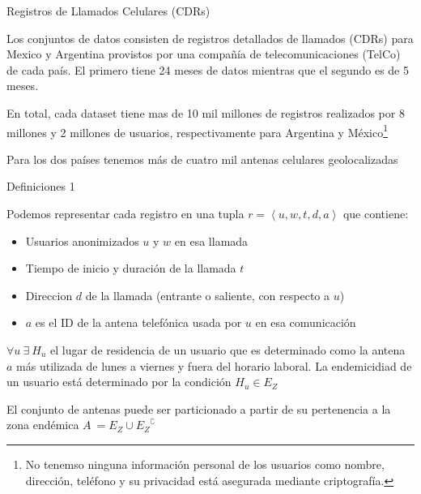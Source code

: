 \documentclass[xcolor=x11names]{beamer}
\begin{document}
\begin{frame}{Registros de Llamados Celulares (CDRs)}

Los conjuntos de datos consisten de registros detallados de llamados (CDRs) para Mexico y Argentina provistos por una compañía de telecomunicaciones (TelCo) de cada país. El primero tiene 24 meses de datos mientras que el segundo es de 5 meses.

\medskip

En total, cada dataset tiene mas de 10 mil millones de registros realizados por 8 millones y 2 millones de usuarios, respectivamente para Argentina y México\footnote{No tenemso ninguna información personal de los usuarios como nombre, dirección, teléfono y su privacidad está asegurada mediante criptografía.}

\medskip
Para los dos países tenemos más de cuatro mil antenas celulares geolocalizadas

\end{frame}


\begin{frame}{Definiciones 1}

	Podemos representar cada registro en una tupla $r =\left < u, w, t, d, a \right >$ que contiene:
	\begin{itemize}
		\item Usuarios anonimizados $u$ y $w$ en esa llamada
		\item Tiempo de inicio y duración de la llamada $t$
		\item Direccion $d$ de la llamada (entrante o saliente, con respecto a $u$)
		\item $a$ es el ID de la antena telefónica usada por $u$ en esa comunicación
	\end{itemize}

	\medskip
	$\forall u \  \exists \  H_u$ el lugar de residencia de un usuario que es determinado como la antena $a$ más utilizada de lunes a viernes y fuera del horario laboral. La endemicidiad de un usuario está determinado por la condición $H_u \in E_Z$

	\medskip

	El conjunto de antenas puede ser particionado a partir de su pertenencia a la zona endémica $A \ = E_Z \cup {E_Z}^{\complement} $

\end{frame}
\end{document}
